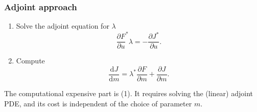 %
%
%

\begin{frame}
    \frametitle{Adjoint approach}
    \begin{enumerate}
        \item Solve the adjoint equation for $\lambda$
              \begin{equation*}
                  \frac{\partial F}{\partial u}^*\lambda= - \frac{\partial J^*}{\partial u}.
              \end{equation*}
        \item Compute
        \begin{equation*}
            \frac{\textrm{d}J}{\textrm{d}m} = \lambda^* \frac{\partial F}{\partial m} + \frac{\partial J}{\partial m}.
        \end{equation*}

    \end{enumerate}

    \vspace{1cm}
    The computational expensive part is (1). It requires solving the (linear) adjoint PDE, and its cost is independent of the choice of parameter $m$.
\end{frame}

